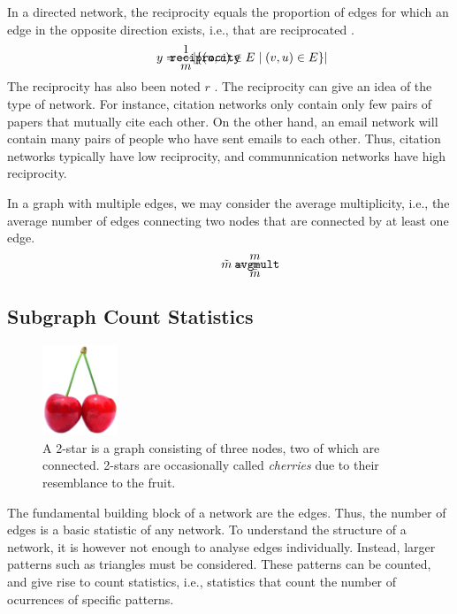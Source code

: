 \documentclass{article}
\def\mathnote#1{%
  \tag*{\rlap{\hspace\marginparsep\smash{\parbox[t]{\marginparwidth}{#1}}}}
}
\begin{document}
In a directed network, the reciprocity equals the proportion of edges
for which an edge in the opposite direction exists, i.e., that are
reciprocated \citep{b866}.  
\begin{align}
  \mathnote{\texttt{reciprocity}}
  y = \frac 1 m  | \{ (u,v) \in E \mid (v,u) \in E \} | 
\end{align}
The reciprocity has also been noted $r$ \citep[e.g.][]{b867}. 
The reciprocity can give an idea of the type of network.  For instance,
citation networks only contain only few pairs of papers that mutually
cite each other.  On the other hand, an email network will contain many
pairs of people who have sent emails to each other.  Thus, citation
networks typically have low reciprocity, and communnication networks
have high reciprocity. 

In a graph with multiple edges, we may consider the average
multiplicity, i.e., the average number of edges connecting two nodes
that are connected by at least one edge. 
\begin{align}
  \mathnote{\texttt{avgmult}}
  \tilde{m} = \frac m {\bar{\bar m}} 
\end{align}

\subsection{Subgraph Count Statistics}
\label{sec:count-statistics}
\begin{figure}
  \centering
  \includegraphics[width=0.20\textwidth]{img/Cherry_Stella444.jpg}
  \caption{
    A 2-star is a graph consisting of three nodes, two of which are
    connected.  2-stars are occasionally called \emph{cherries} due to
    their resemblance to the fruit.
    \label{fig:cherries}
  }
\end{figure}
The fundamental building block of a network are the edges.  Thus, the
number of edges is a basic statistic of any network.  To understand the
structure of a network, it is however not enough to analyse edges
individually.  Instead, larger patterns such as triangles must be
considered.  These patterns can be counted, and give rise to count
statistics, i.e., statistics that count the number of ocurrences of
specific patterns. 
\end{document}
